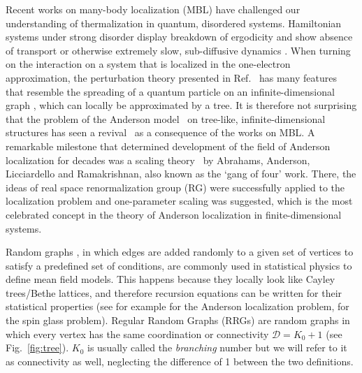 \documentclass[reprint,aps,prl,superscriptaddress,english,nolongbibliography]{revtex4-1}
\begin{document}
Recent works on many-body localization (MBL) \cite{Basko06,Pal10,Serbyn13b,ros2015integrals,Nandkishore15,Imbrie17,Abanin2019colloquium} have challenged our understanding of thermalization in quantum, disordered systems. Hamiltonian systems under strong disorder display breakdown of ergodicity and show absence of transport or otherwise extremely slow, sub-diffusive dynamics \cite{vznidarivc2016diffusive}. When turning on the interaction on a system that is localized in the one-electron approximation, the perturbation theory presented in Ref.~\cite{Basko06} has many features that resemble the spreading of a quantum particle on an infinite-dimensional graph \cite{altshuler1997quasiparticle}, which can locally be approximated by a tree. It is therefore not surprising that the problem of the Anderson model~\cite{Anderson1958absence} on tree-like, infinite-dimensional structures has seen a revival~\cite{de2014anderson,parisi2019anderson,biroli2017delocalized,tikhonov2021AndersonMBL,Lemariè2022critical,baroni2023corrections,Mata2017Scaling,Mata2020two,tikhonov2016fractality,arenz2023wegner,Altshuler2016Nonergodic,Pino2020Scaling,zirnbauer2023wegner} as a consequence of the works on MBL. A remarkable milestone that determined development of the field of Anderson localization for decades was a scaling theory~\cite{abrahams1979scaling} by Abrahams, Anderson, Licciardello and Ramakrishnan, also known as the ‘gang of four' work. There, the ideas of real space renormalization group (RG) were successfully applied to the localization problem and one-parameter scaling was suggested, which is the most celebrated concept in the theory of Anderson localization in finite-dimensional systems.

Random graphs \cite{bollobas1998random}, in which edges are added randomly to a given set of vertices to satisfy a predefined set of conditions, are commonly used in statistical physics to define mean field models. This happens because they locally look like Cayley trees/Bethe lattices, and therefore recursion equations can be written for their statistical properties (see for example \cite{abou1973selfconsistent,aizenman2006absolutely} for the Anderson localization problem, \cite{thouless1977solution,chayes1986mean,mezard1987spin,mezard2001bethe} for the spin glass problem). Regular Random Graphs (RRGs) are  random graphs in which every vertex has the same coordination or connectivity $\mathcal{D}=K_0+1$ (see Fig.~\ref{fig:tree}). $K_0$ is usually called the {\it branching} number but we will refer to it as connectivity as well, neglecting the difference of 1 between the two definitions.
\end{document}

